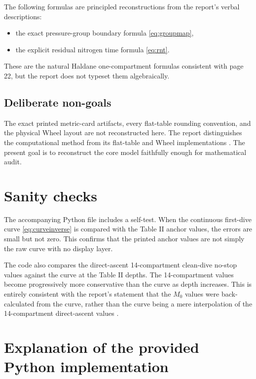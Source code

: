 \documentclass[11pt]{article}
\begin{document}
The following formulas are principled reconstructions from the report's verbal descriptions:
\begin{itemize}
\item the exact pressure-group boundary formula \eqref{eq:groupmap},
\item the explicit residual nitrogen time formula \eqref{eq:rnt}.
\end{itemize}
These are the natural Haldane one-compartment formulas consistent with page 22, but the report does not typeset them algebraically.

\subsection{Deliberate non-goals}

The exact printed metric-card artifacts, every flat-table rounding convention, and the physical Wheel layout are not reconstructed here. The report distinguishes the computational method from its flat-table and Wheel implementations \cite[p.~23]{Hamilton1994}. The present goal is to reconstruct the core model faithfully enough for mathematical audit.

\section{Sanity checks}

The accompanying Python file includes a self-test. When the continuous first-dive curve \eqref{eq:curveinverse} is compared with the Table II anchor values, the errors are small but not zero. This confirms that the printed anchor values are not simply the raw curve with no display layer.

The code also compares the direct-ascent 14-compartment clean-dive no-stop values against the curve at the Table II depths. The 14-compartment values become progressively more conservative than the curve as depth increases. This is entirely consistent with the report's statement that the $M_0$ values were back-calculated from the curve, rather than the curve being a mere interpolation of the 14-compartment direct-ascent values \cite[p.~21]{Hamilton1994}.

\section{Explanation of the provided Python implementation}
\end{document}
